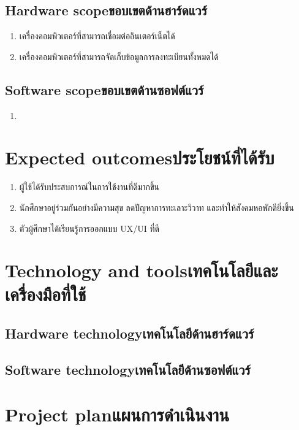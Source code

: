 \subsection{\ifenglish Hardware scope\else ขอบเขตด้านฮาร์ดแวร์\fi}
\begin{enumerate}
    \item เครื่องคอมพิวเตอร์ที่สามารถเชื่อมต่ออินเตอร์เน็ตได้
    \item เครื่องคอมพิวเตอร์ที่สามารถจัดเก็บข้อมูลการลงทะเบียนทั้งหมดได้
\end{enumerate}

\subsection{\ifenglish Software scope\else ขอบเขตด้านซอฟต์แวร์\fi}
\begin{enumerate}
    \item 
\end{enumerate}

\section{\ifenglish Expected outcomes\else ประโยชน์ที่ได้รับ\fi}
\begin{enumerate}
    \item ผู้ใช้ได้รับประสบการณ์ในการใช้งานที่ดีมากขึ้น
    \item นักศึกษาอยู่ร่วมกันอย่างมีความสุข ลดปัญหาการทะเลาะวิวาท และทำให้สังคมหอพักดียิ่งขึ้น
    \item ตัวผู้ศึกษาได้เรียนรู้การออกแบบ UX/UI ที่ดี
\end{enumerate}

\section{\ifenglish Technology and tools\else เทคโนโลยีและเครื่องมือที่ใช้\fi}

\subsection{\ifenglish Hardware technology\else เทคโนโลยีด้านฮาร์ดแวร์\fi}

\subsection{\ifenglish Software technology\else เทคโนโลยีด้านซอฟต์แวร์\fi}

\section{\ifenglish Project plan\else แผนการดำเนินงาน\fi}

